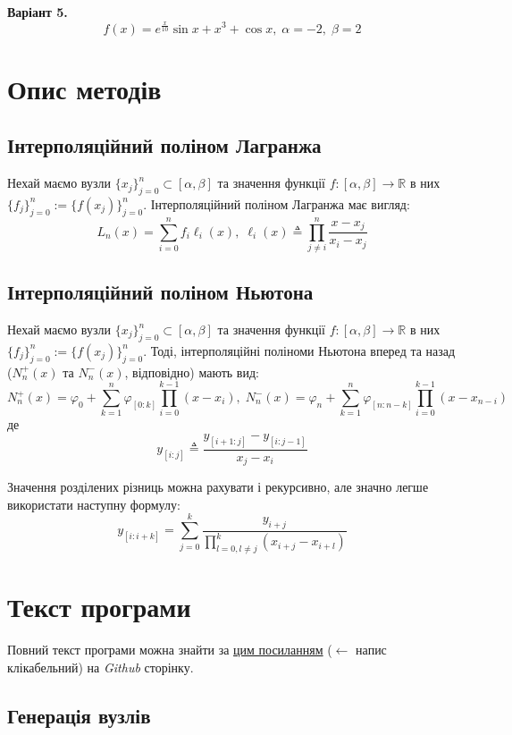 \documentclass[12pt]{extarticle}
\begin{document}
\textbf{Варіант 5.}
\[
f(x) = e^{\frac{x}{10}}\sin x + x^3 + \cos x, \; \alpha=-2, \; \beta = 2
\]

\pagebreak
\section{Опис методів}

\subsection{Інтерполяційний поліном Лагранжа}

Нехай маємо вузли $\{x_j\}_{j=0}^n \subset [\alpha,\beta]$ та значення функції $f: [\alpha,\beta] \to \mathbb{R}$ в них $\{f_j\}_{j=0}^n := \{f(x_j)\}_{j=0}^n$. Інтерполяційний поліном Лагранжа має вигляд:
\[
L_n(x) = \sum_{i=0}^n f_i\ell_i(x), \; \ell_i(x) \triangleq \prod_{j \neq i}^n \frac{x-x_j}{x_i-x_j}
\]

\subsection{Інтерполяційний поліном Ньютона}

Нехай маємо вузли $\{x_j\}_{j=0}^n \subset [\alpha,\beta]$ та значення функції $f: [\alpha,\beta] \to \mathbb{R}$ в них $\{f_j\}_{j=0}^n := \{f(x_j)\}_{j=0}^n$. Тоді, інтерполяційні поліноми Ньютона вперед та назад ($N_n^+(x)$ та $N_n^{-}(x)$, відповідно) мають вид:
\[
N_n^+(x) = \varphi_0 + \sum_{k=1}^n \varphi_{[0:k]}\prod_{i=0}^{k-1} (x-x_i), \; N_n^{-}(x) = \varphi_n + \sum_{k=1}^n \varphi_{[n:n-k]} \prod_{i=0}^{k-1} (x-x_{n-i})
\]
де
\[
y_{[i:j]} \triangleq \frac{y_{[i+1:j]}-y_{[i:j-1]}}{x_j-x_i}
\]

Значення розділених різниць можна рахувати і рекурсивно, але значно легше використати наступну формулу:
\[
y_{[i:i+k]} = \sum_{j=0}^{k} \frac{y_{i+j}}{\prod_{l=0,l\neq j}^k (x_{i+j} - x_{i+l})}
\]

\pagebreak
\section{Текст програми}

Повний текст програми можна знайти за \href{https://github.com/ZamDimon/University-Homeworks/tree/main/Term%205/Numerical%20Analysis/lab_1}{цим посиланням} ($\leftarrow$ напис клікабельний) на \textit{Github} сторінку.

\subsection{Генерація вузлів}
\end{document}
